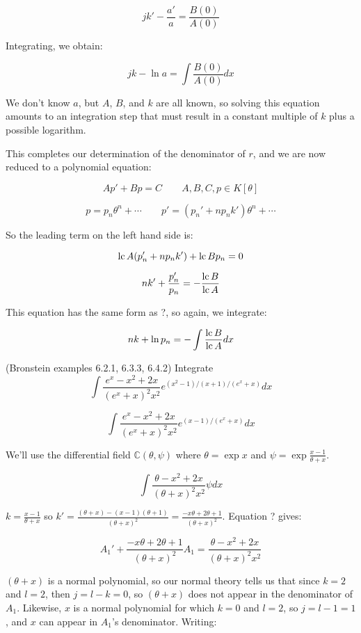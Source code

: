 
$$ jk' - \frac{a'}{a }  = \frac{B(0)}{A(0)}$$

Integrating, we obtain:

$$ jk - \ln a = \int \frac{B(0)}{A(0)} dx$$

We don't know $a$, but $A$, $B$, and $k$ are all known, so solving
this equation amounts to an integration step that must result in a
constant multiple of $k$ plus a possible logarithm.

This completes our determination of the denominator of $r$, and we
are now reduced to a polynomial equation:

$$A p' + B p = C \qquad A,B,C,p \in K[\theta]$$

$$p = p_n \theta^n + \cdots \qquad p' = (p_n' + n p_n k') \theta^n + \cdots$$

So the leading term on the left hand side is:

$${\rm lc\,} A (p_n' + n p_n k') + {\rm lc\,} B p_n = 0$$

$$n k' + \frac{p_n'}{p_n} = - \frac{{\rm lc}\, B}{{\rm lc}\, A}$$

This equation has the same form as ?, so again, we integrate:

$$n k + \ln p_n = - \int \frac{{\rm lc}\, B}{{\rm lc}\, A} dx$$

\vfill\eject

\example (Bronstein examples 6.2.1, 6.3.3, 6.4.2) Integrate
$$\int \frac{e^x - x^2 + 2x}{(e^x + x)^2 x^2}e^{(x^2-1)/(x+1)/(e^x+x)} dx$$

$$\int \frac{e^x - x^2 + 2x}{(e^x + x)^2 x^2}e^{(x-1)/(e^x+x)} dx$$

We'll use the differential field ${\mathbb C}(\theta, \psi)$ where
$\theta = \exp x$ and $\psi = \exp \frac{x-1}{\theta+x}$.

$$\int \frac{\theta - x^2 + 2x}{(\theta + x)^2 x^2} \psi dx$$

$k = \frac{x-1}{\theta+x}$ so
$k' = \frac{(\theta+x) - (x-1)(\theta+1)}{(\theta+x)^2} = \frac{-x\theta + 2 \theta +1}{(\theta+x)^2}$.
Equation ? gives:

$$A_1' + \frac{-x\theta + 2 \theta +1}{(\theta+x)^2} A_1 = \frac{\theta - x^2 + 2x}{(\theta + x)^2 x^2}$$

$(\theta+x)$ is a normal polynomial, so our normal theory tells us that
since $k=2$ and $l=2$, then $j=l-k=0$, so $(\theta+x)$ does not appear
in the denominator of $A_1$.  Likewise, $x$ is a normal polynomial
for which $k=0$ and $l=2$, so $j=l-1 = 1$, and $x$ can appear in
$A_1$'s denominator.  Writing:

